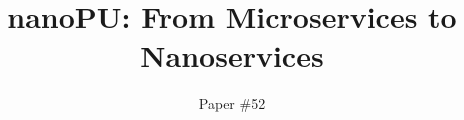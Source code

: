 \documentclass[sigconf,10pt,preprint,balance]{acmart}
\begin{document}
\title{nanoPU: From Microservices to Nanoservices}

\author{Paper \#52}







\if{}
    \setcounter{page}{0}
    \listoftodos {}
    \clearpage
\fi



\maketitle

\if{}
    \pagestyle{plain}
\fi











\label{lastpage}

{\footnotesize 


}

\label{totalpage}
\end{document}
